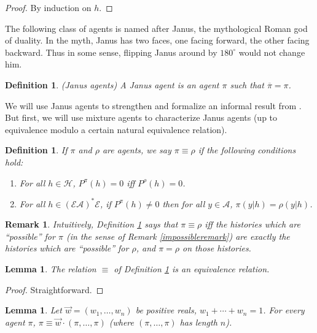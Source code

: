 \documentclass[twoside]{article}
\newtheorem{definition}[theorem]{Definition}
\newtheorem{remark}[theorem]{Remark}
\newtheorem{lemma}[theorem]{Lemma}
\begin{document}
\begin{proof}
    By induction on $h$.
\end{proof}

The following class of agents is named after Janus, the mythological
Roman god of duality. In the myth, Janus has two faces, one facing
forward, the other facing backward. Thus in some sense, flipping Janus
around by $180^\circ$ would not change him.

\begin{definition}
    (Janus agents)
    A \emph{Janus agent} is an agent $\pi$ such that
    $\overline{\pi}=\pi$.
\end{definition}

We will use Janus agents to strengthen and formalize an informal result
from \cite{alexander2021reward}.
But first, we will use mixture agents to characterize
Janus agents (up to equivalence modulo a certain natural equivalence relation).

\begin{definition}
\label{equivdefn}
    If $\pi$ and $\rho$ are agents, we say $\pi\equiv\rho$ if the
    following conditions hold:
    \begin{enumerate}
        \item For all $h\in\mathcal H$, $P^\pi(h)=0$ iff $P^\rho(h)=0$.
        \item For all $h\in(\mathcal E\mathcal A)^*\mathcal E$,
            if $P^\pi(h)\not=0$ then for all $y\in\mathcal A$,
            $\pi(y|h)=\rho(y|h)$.
    \end{enumerate}
\end{definition}

\begin{remark}
    Intuitively, Definition \ref{equivdefn} says that $\pi\equiv\rho$
    iff the histories which are ``possible'' for $\pi$ (in the sense of
    Remark \ref{impossibleremark}) are exactly the histories which are
    ``possible'' for $\rho$, and $\pi=\rho$ on those histories.
\end{remark}

\begin{lemma}
\label{equivrelationlemma}
    The relation $\equiv$ of Definition \ref{equivdefn} is an equivalence
    relation.
\end{lemma}

\begin{proof}
    Straightforward.
\end{proof}

\begin{lemma}
\label{piopluspilemma}
    Let $\vec w=(w_1,\ldots,w_n)$ be positive reals,
    $w_1+\cdots+w_n=1$. For every agent $\pi$,
    $\pi\equiv\vec w\cdot (\pi,\ldots,\pi)$ (where
    $(\pi,\ldots,\pi)$ has length $n$).
\end{lemma}
\end{document}
